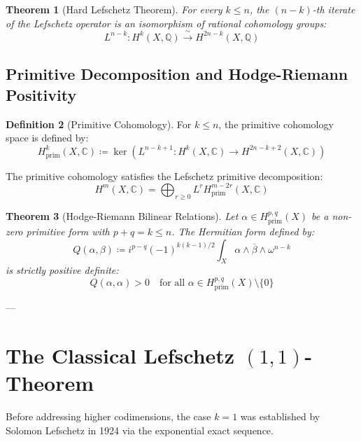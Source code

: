 \documentclass[11pt,a4paper]{article}
\newtheorem{theorem}{Theorem}[section]
\theoremstyle{definition}
\newtheorem{definition}[theorem]{Definition}
\begin{document}
\begin{theorem}[Hard Lefschetz Theorem]
For every $k \le n$, the $(n-k)$-th iterate of the Lefschetz operator is an isomorphism of rational cohomology groups:
\begin{equation}
L^{n-k} : H^k(X, \mathbb{Q}) \xrightarrow{\;\sim\;} H^{2n-k}(X, \mathbb{Q})
\end{equation}
\end{theorem}

\subsection{Primitive Decomposition and Hodge-Riemann Positivity}
\begin{definition}[Primitive Cohomology]
For $k \le n$, the primitive cohomology space is defined by:
\begin{equation}
H^k_{\mathrm{prim}}(X, \mathbb{C}) \coloneqq \ker\left( L^{n-k+1} : H^k(X, \mathbb{C}) \to H^{2n-k+2}(X, \mathbb{C}) \right)
\end{equation}
\end{definition}

The primitive cohomology satisfies the Lefschetz primitive decomposition:
\begin{equation}
H^m(X, \mathbb{C}) = \bigoplus_{r \ge 0} L^r H^{m-2r}_{\mathrm{prim}}(X, \mathbb{C})
\end{equation}

\begin{theorem}[Hodge-Riemann Bilinear Relations]
Let $\alpha \in H^{p,q}_{\mathrm{prim}}(X)$ be a non-zero primitive form with $p+q = k \le n$. The Hermitian form defined by:
\begin{equation}
Q(\alpha, \beta) \coloneqq i^{p-q} (-1)^{k(k-1)/2} \int_X \alpha \wedge \overline{\beta} \wedge \omega^{n-k}
\end{equation}
is strictly positive definite:
\begin{equation}
Q(\alpha, \alpha) > 0 \quad \text{for all } \alpha \in H^{p,q}_{\mathrm{prim}}(X) \setminus \{0\}
\end{equation}
\end{theorem}

---

\section{\texorpdfstring{The Classical Lefschetz $(1,1)$-Theorem}{The Classical Lefschetz (1,1)-Theorem}}
Before addressing higher codimensions, the case $k=1$ was established by Solomon Lefschetz in 1924 via the exponential exact sequence.
\end{document}
